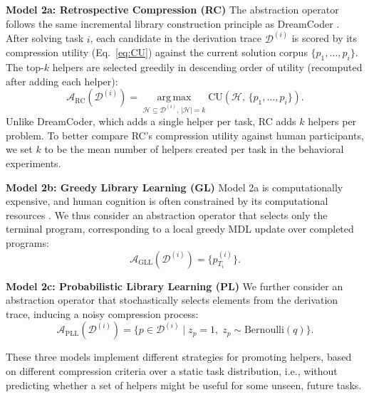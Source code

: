 \documentclass{article}
\begin{document}
\textbf{Model 2a: Retrospective Compression (RC)}
The abstraction operator follows the same incremental library construction principle as DreamCoder \citep{ellis2023dreamcoder}. 
After solving task $i$, each candidate in the derivation trace $\mathcal{D}^{(i)}$ is scored by its compression utility (Eq.~\ref{eq:CU}) against the current solution corpus $\{p_1, \ldots, p_i\}$. The top-$k$ helpers are selected greedily in descending order of utility (recomputed after adding each helper):
\[
\mathcal{A}_{\mathrm{RC}}(\mathcal{D}^{(i)}) = \operatorname*{arg\,max}_{
\mathcal{H} \subseteq \mathcal{D}^{(i)},\, |\mathcal{H}|=k} 
\mathrm{CU}(\mathcal{H},\, \{p_1, \ldots, p_i\}).
\]
Unlike DreamCoder, which adds a single helper per task, RC adds $k$ helpers per problem.
To better compare RC's compression utility against human participants, we set $k$ to be the mean number of helpers created per task in the behavioral experiments.


\textbf{Model 2b: Greedy Library Learning (GL)}
Model 2a is computationally expensive, and human cognition is often constrained by its computational resources \citep{lieder2020resource,zhao2024model}. We thus consider an abstraction operator that selects only the terminal program, corresponding to a local greedy MDL update over completed programs:
\[
\mathcal{A}_{\mathrm{GLL}}(\mathcal{D}^{(i)}) = \{p^{(i)}_{T_i}\}.
\]

\textbf{Model 2c: Probabilistic Library Learning (PL)}
We further consider an abstraction operator that stochastically selects elements from the derivation trace, inducing a noisy compression process:
\[
\mathcal{A}_{\mathrm{PLL}}(\mathcal{D}^{(i)}) = \{p \in \mathcal{D}^{(i)} \mid z_p = 1,\; z_p \sim \mathrm{Bernoulli}(q)\}.
\]

These three models implement different strategies for promoting helpers, based on different compression criteria over a static task distribution, i.e., without predicting whether a set of helpers might be useful for some unseen, future tasks.
\end{document}
